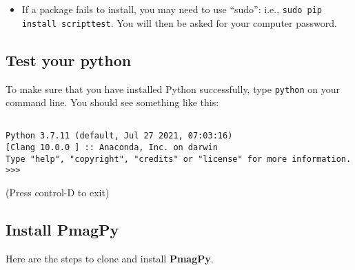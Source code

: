 \documentclass[11pt]{article}
\begin{document}
\begin{itemize}
\item If a package fails to install, you may need to use ``sudo'': i.e., \texttt{sudo pip install scripttest}.  You will then be asked for your computer password.

  \end{itemize}



\subsection{Test your python}


To make sure that you have installed Python successfully, type \texttt{python} on your command line.  You should see something like this: \begin{verbatim}

Python 3.7.11 (default, Jul 27 2021, 07:03:16)
[Clang 10.0.0 ] :: Anaconda, Inc. on darwin
Type "help", "copyright", "credits" or "license" for more information.
>>>\end{verbatim}
(Press control-D to exit)


\subsection{Install PmagPy}

Here are the steps to clone and install {\bf PmagPy}.
\end{document}
